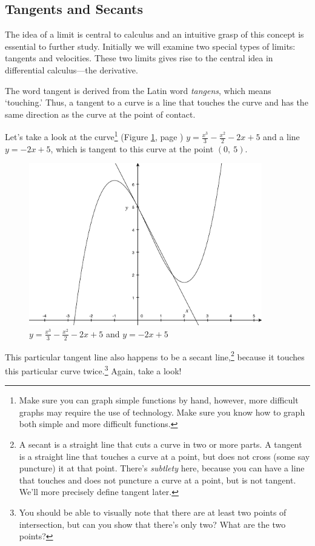 \documentclass[12pt,addpoints, answers, fleqn]{exam}
\begin{document}
\subsection{Tangents and Secants}

The idea of a limit is central to calculus and an intuitive grasp of this concept is essential to further study. Initially we will examine two special types of limits: tangents and velocities. These two limits gives rise to the central idea in differential calculus---the derivative.

The word tangent is derived from the Latin word \emph{tangens}, which means `touching.' Thus, a tangent to a curve is a line that touches the curve and has the same direction as the curve at the point of contact.

Let's take a look at the curve\footnote{Make sure you can graph simple functions by hand, however, more difficult graphs may require the use of technology. Make sure you know how to graph both simple and more difficult functions.} (Figure \ref{fig:graph0201}, page \pageref{fig:graph0201}) $\displaystyle y = \frac{x^3}{3} -\frac{x^2}{2} - 2x + 5$  and a line $y=-2x+5$, which is tangent to this curve at the point $\left( 0, \ 5 \right)$.
\begin{figure}[htbp] %
   \centering
   \includegraphics[width=4in]{./graphics/graph0201.pdf} 
   \caption{$\displaystyle y = \frac{x^3}{3} -\frac{x^2}{2} - 2x + 5$ and $y=-2x+5$ }
   \label{fig:graph0201}
\end{figure}

This particular tangent line also happens to be a secant line,\footnote{A secant is a straight line that cuts a curve in two or more parts. A tangent is a straight line that touches a curve at a point, but does not cross (some say puncture) it at that point. There's \emph{subtlety} here, because you can have a line that touches and does not puncture  a curve at a point, but is not tangent. We'll more precisely define tangent later.} because it touches this particular curve twice.\footnote{You should be able to visually note that there are at least two points of intersection, but can you show that there's only two? What are the two points?} Again, take a look!
\end{document}
